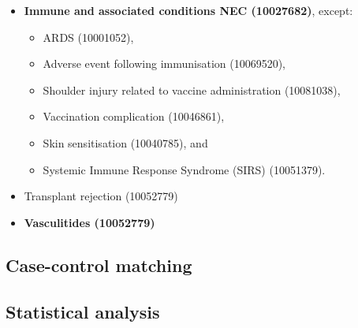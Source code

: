 \documentclass{article}
\begin{document}
\begin{itemize}
\begin{itemize}
\begin{itemize}
                                                        \item \textbf{Immune and associated conditions NEC (10027682)}, except: \begin{itemize}
                                                                                                                                    \item ARDS (10001052),
                                                                                                                                    \item Adverse event following immunisation (10069520),
                                                                                                                                    \item Shoulder injury related to vaccine administration (10081038),
                                                                                                                                    \item Vaccination complication (10046861),
                                                                                                                                    \item Skin sensitisation (10040785), and
                                                                                                                                    \item Systemic Immune Response Syndrome (SIRS) (10051379).
                                                        \end{itemize}
                                                        \item Transplant rejection (10052779)
                                                        \item \textbf{Vasculitides (10052779)}
              \end{itemize}
    \end{itemize}
\end{itemize}

\subsection{Case-control matching}


	
\subsection{Statistical analysis}
	
\end{document}
